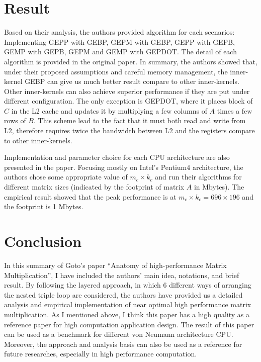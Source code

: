 \documentclass[a4paper,12pt]{article}
\begin{document}
\section{Result}
Based on their analysis, the authors provided algorithm for each scenarios: Implementing GEPP with GEBP, GEPM with GEBP, GEPP with GEPB, GEMP with GEPB, GEPM and GEMP with GEPDOT. The detail of each algorithm is provided in the original paper. In summary, the authors showed that, under their proposed assumptions and careful memory management, the inner-kernel GEBP can give us much better result compare to other inner-kernels. Other inner-kernels can also achieve superior performance if they are put under different configuration. The only exception is GEPDOT, where it places block of $C$ in the L2 cache and updates it by multiplying a few columns of $A$ times a few rows of $B$. This scheme lead to the fact that it must both read and write from L2, therefore requires twice the bandwidth between L2 and the registers compare to other inner-kernels.

Implementation and parameter choice for each CPU architecture are also presented in the paper. Focusing mostly on Intel's Pentium4 architecture, the authors chose some appropriate value of $m_c \times k_c$ and run their algorithms for different matrix sizes (indicated by the footprint of matrix $A$ in Mbytes). The empirical result showed that the peak performance is at $m_c \times k_c = 696 \times 196$ and the footprint is 1 Mbytes.

\section{Conclusion}
In this summary of Goto's paper ``Anatomy of high-performance Matrix Multiplication'', I have included the authors' main idea, notations, and brief result. By following the layered approach, in which 6 different ways of arranging the nested triple loop are considered, the authors have provided us a detailed analysis and empirical implementation of near optimal high performance matrix multiplication.  As I mentioned above, I think this paper has a high quality as a reference paper for high computation application design. The result of this paper can be used as a benchmark for different von Neumann architecture CPU. Moreover, the approach and analysis basis can also be used as a reference for future researches, especially in high performance computation.
\end{document}
